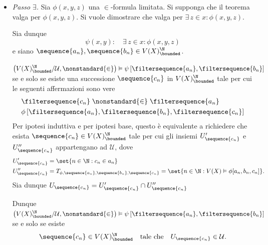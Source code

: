 {\begin{itemize}
        Poiché $ \mathcal{U} $ è un ultrafiltro allora è primo, e quindi la condizione di cui sopra è equivalente a $ T_{\phi, \sequence{a_{n} }}  \cup T_{\psi, \sequence{a_{n} }}  \in \mathcal{U} $. La tesi segue dal fatto che \begin{equation*}
            T_{\phi, \sequence{a_{n} }}  \cup T_{\psi, \sequence{a_{n} }} = T_{\phi\lor\psi, \sequence{a_{n} }}. 
        \end{equation*}
        \item \textit{Passo $ \exists $.} Sia $ \phi(x,y,z) $ una $ \in $-formula limitata. Si supponga che il teorema valga per $ \phi(x,y,z) $. Si vuole dimostrare che valga per $ \exists\,z \in x: \phi(x,y,z) $.
        
        Sia dunque \begin{equation*}
            \psi(x,y): \quad \exists\,z \in x: \phi(x,y,z)
        \end{equation*}e siano $ \sequence{a_{n} }, \sequence{b_{n} } \in V(X)^{\N}_{\bounded}$. 

        $\left(V(X)^{\N}_{\bounded}/\mathcal{U}, \nonstandard{\in}\right)\vDash\psi\left[\filtersequence{a_{n}},\filtersequence{b_{n}}\right]  $ se e solo se esiste una successione $ \sequence{c_{n}} $ in $ V(X)^{\N}_{\bounded} $ tale per cui le seguenti affermazioni sono vere \begin{align*}
            &\filtersequence{c_{n}} \mathrel{\nonstandard{\in}} \filtersequence{a_{n}}\\
            &\phi\left[\filtersequence{a_{n}},\filtersequence{b_{n}},\filtersequence{c_{n}}\right]
        \end{align*}Per ipotesi induttiva e per ipotesi base, questo è equivalente a richiedere che esista $ \sequence{c_{n} } \in V(X)^{\N}_{\bounded} $ tale per cui gli insiemi $ U_{\sequence{c_{n} }}'  $ e $ U_{\sequence{c_{n} }}'' $ appartengano ad $ \mathcal{U}  $, dove \begin{align*}
            U_{\sequence{c_{n} }}' &= \set{n \in \N: c_{n} \in a_{n}  }\\ 
            U_{\sequence{c_{n} }}'' &= T_{\phi, \sequence{a_{n} }, \sequence{b_{n} }, \sequence{c_{n} }} = \set{n \in \N: V(X)\vDash \phi[a_{n}, b_{n}, c_{n}   ]}. 
        \end{align*}Sia dunque $ U_{\sequence{c_{n} }} =  U_{\sequence{c_{n} }}'\cap U_{\sequence{c_{n} }}'' $

        Dunque $\left(V(X)^{\N}_{\bounded}/\mathcal{U}, \nonstandard{\in}\right)\vDash\psi\left[\filtersequence{a_{n}},\filtersequence{b_{n}}\right]  $ se e solo se esiste \[
            \sequence{c_{n} } \in V(X)^{\N}_{\bounded}\quad\text{tale che}\quad U _{\sequence{c_{n}}} \in \mathcal{U}.
        \]


\end{itemize}}
